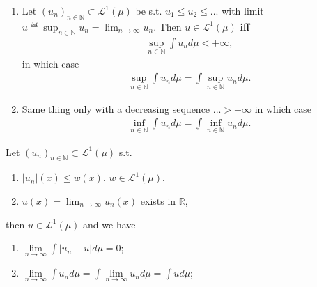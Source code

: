 \begin{theorem}
    \quad
    
    \begin{enumerate}[label=(\roman*)]
        \item Let \((u_n)_{n\in\mathbb{N}}\subset \mathcal{L}^{1}(\mu)\) be s.t. \(u_1\leq u_2 \leq ...\) with limit 
        \(u\eqdef \sup_{n\in\mathbb{N}}u_n = \lim_{n\rightarrow\infty} u_n\). Then \(u\in\mathcal{L}^{1}(\mu)\) \textbf{iff} 
        \begin{eqnarray*}
            \sup\limits_{n\in\mathbb{N}}\int u_nd\mu <+\infty,
        \end{eqnarray*}
        in which case
        \begin{eqnarray*}
            \sup\limits_{n\in\mathbb{N}}\int u_n d\mu = \int\sup\limits_{n\in\mathbb{N}}u_n d\mu.
        \end{eqnarray*}
        \item Same thing only with a decreasing sequence ...\(>-\infty\) in which case
        \begin{eqnarray*}
            \inf\limits_{n\in\mathbb{N}}\int u_n d\mu = \int\inf\limits_{n\in\mathbb{N}}u_n d\mu.
        \end{eqnarray*}
    \end{enumerate}
\end{theorem}

\begin{theorem}
    Let \((u_n)_{n\in\mathbb{N}}\subset\mathcal{L}^{1}(\mu)\) s.t.
    \begin{enumerate}[label=(\alph*)]
        \item \(|u_n|(x)\leq w(x)\), \(w\in\mathcal{L}^{1}(\mu)\),
        \item \(u(x) = \lim_{n\rightarrow\infty}u_n(x)\) exists in \(\bar{\mathbb{R}}\),
    \end{enumerate}
    then \(u\in\mathcal{L}^{1}(\mu)\) and we have
    \begin{enumerate}[label=(\roman*)]
        \item \(\lim\limits_{n\rightarrow\infty} \int \vert u_n - u\vert d\mu = 0\);
        \item \(\lim\limits_{n\rightarrow\infty} \int u_n d\mu = \int\lim\limits_{n\rightarrow\infty}u_n d\mu = \int ud\mu\);
    \end{enumerate}
\end{theorem}
\ifdetailed
